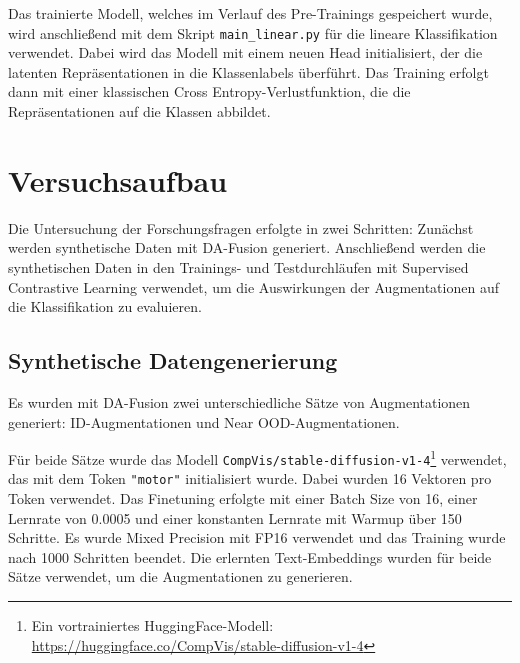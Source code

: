 Das trainierte Modell, welches im Verlauf des Pre-Trainings gespeichert wurde, wird anschließend mit dem Skript \lstinline{main_linear.py} für die lineare Klassifikation verwendet. Dabei wird das Modell mit einem neuen Head initialisiert, der die latenten Repräsentationen in die Klassenlabels überführt. Das Training erfolgt dann mit einer klassischen Cross Entropy-Verlustfunktion, die die Repräsentationen auf die Klassen abbildet.


\section{Versuchsaufbau} \label{sec:experiment-setup}

Die Untersuchung der Forschungsfragen erfolgte in zwei Schritten: Zunächst werden synthetische Daten mit DA-Fusion generiert. Anschließend werden die synthetischen Daten in den Trainings- und Testdurchläufen mit Supervised Contrastive Learning verwendet, um die Auswirkungen der Augmentationen auf die Klassifikation zu evaluieren.

\subsection{Synthetische Datengenerierung} \label{sec:da-fusion-setup}

Es wurden mit DA-Fusion zwei unterschiedliche Sätze von Augmentationen generiert: ID-Augmentationen und Near OOD-Augmentationen.

Für beide Sätze wurde das Modell \lstinline{CompVis/stable-diffusion-v1-4}\footnote{Ein vortrainiertes HuggingFace-Modell: \url{https://huggingface.co/CompVis/stable-diffusion-v1-4}} verwendet, das mit dem Token \lstinline{"motor"} initialisiert wurde. Dabei wurden 16 Vektoren pro Token verwendet. Das Finetuning erfolgte mit einer Batch Size von 16, einer Lernrate von 0.0005 und einer konstanten Lernrate mit Warmup über 150 Schritte. Es wurde Mixed Precision mit FP16 verwendet und das Training wurde nach 1000 Schritten beendet. Die erlernten Text-Embeddings wurden für beide Sätze verwendet, um die Augmentationen zu generieren.

